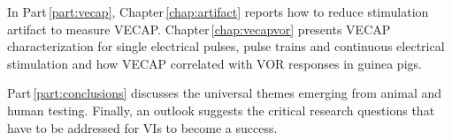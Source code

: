 In Part\,\ref{part:vecap}, Chapter\,\ref{chap:artifact} reports how to reduce stimulation artifact to measure VECAP. Chapter\,\ref{chap:vecapvor} presents VECAP characterization for single electrical pulses, pulse trains and continuous electrical stimulation and how VECAP correlated with VOR responses in guinea pigs.

Part\,\ref{part:conclusions} discusses the universal themes emerging from animal and human testing. Finally, an outlook suggests the critical research questions that have to be addressed for VIs to become a success.